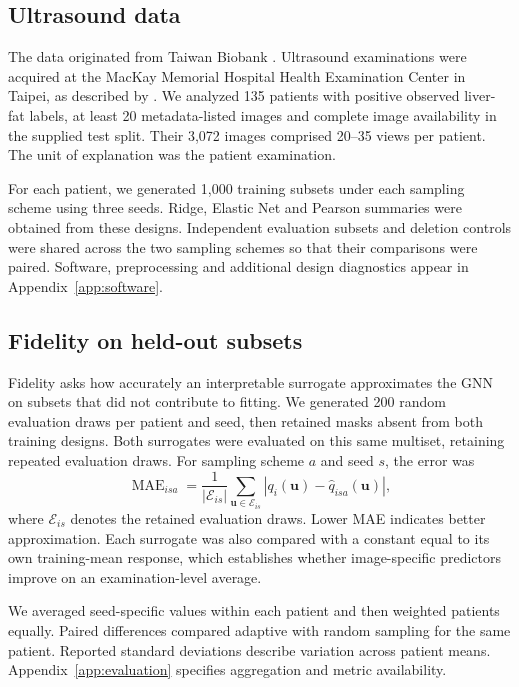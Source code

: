 \subsection{Ultrasound data}
The data originated from Taiwan Biobank \citep{feng2022taiwan}. Ultrasound examinations were acquired at the MacKay Memorial Hospital Health Examination Center in Taipei, as described by \citet{yen2024fattyliver}. We analyzed 135 patients with positive observed liver-fat labels, at least 20 metadata-listed images and complete image availability in the supplied test split. Their 3,072 images comprised 20--35 views per patient. The unit of explanation was the patient examination.

For each patient, we generated 1,000 training subsets under each sampling scheme using three seeds. Ridge, Elastic Net and Pearson summaries were obtained from these designs. Independent evaluation subsets and deletion controls were shared across the two sampling schemes so that their comparisons were paired. Software, preprocessing and additional design diagnostics appear in Appendix~\ref{app:software}.

\subsection{Fidelity on held-out subsets}
Fidelity asks how accurately an interpretable surrogate approximates the GNN on subsets that did not contribute to fitting. We generated 200 random evaluation draws per patient and seed, then retained masks absent from both training designs. Both surrogates were evaluated on this same multiset, retaining repeated evaluation draws. For sampling scheme $a$ and seed $s$, the error was
\begin{equation}
\operatorname{MAE}_{isa}=
\frac{1}{|\mathcal E_{is}|}\sum_{\boldsymbol u\in\mathcal E_{is}}
\left|q_i(\boldsymbol u)-\widehat q_{isa}(\boldsymbol u)\right|,
\label{eq:mae}
\end{equation}
where $\mathcal E_{is}$ denotes the retained evaluation draws. Lower MAE indicates better approximation. Each surrogate was also compared with a constant equal to its own training-mean response, which establishes whether image-specific predictors improve on an examination-level average.

We averaged seed-specific values within each patient and then weighted patients equally. Paired differences compared adaptive with random sampling for the same patient. Reported standard deviations describe variation across patient means. Appendix~\ref{app:evaluation} specifies aggregation and metric availability.

